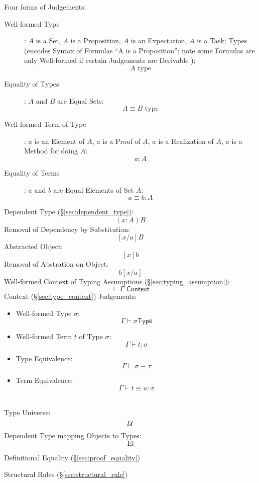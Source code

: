 Four forms of Judgements:
\begin{description}
  \item [Well-formed Type]: $A$ is a Set, $A$ is a Proposition, $A$ is
    an Expectation, $A$ is a Task; Types (encodes Syntax of Formulas
    ``A is a Proposition''; note some Formulas are only Well-formed if
    certain Judgements are Derivable \cite{thompson99}):
    \[
      A \text{ type}
    \]
  \item [Equality of Types]: $A$ and $B$ are Equal Sets:
    \[
      A \equiv B \text{ type}
    \]
  \item [Well-formed Term of Type]: $a$ is an Element of $A$, $a$ is a
    Proof of $A$, $a$ is a Realization of $A$, $a$ is a Method for
    doing $A$:
    \[
      a : A
    \]
  \item [Equality of Terms]: $a$ and $b$ are Equal Elements of Set $A$:
    \[
      a \equiv b : A
    \]
\end{description}

Dependent Type (\S\ref{sec:dependent_type}):
\[
  (x:A)B
\]
Removal of Dependency by Substitution:
\[
  [x/a]B
\]
Abstracted Object:
\[
  [x]b
\]
Removal of Abstration on Object:
\[
  b[x/a]
\]
Well-formed Context of Typing Assumptions
(\S\ref{sec:typing_assumption}):
\[
  \vdash \Gamma \textsf{ Context}
\]
Context (\S\ref{sec:type_context}) Judgements:
\begin {itemize}
\item Well-formed Type $\sigma$:
  \[
    \Gamma \vdash \sigma \mathsf{ Type}
  \]
\item Well-formed Term $t$ of Type $\sigma$:
  \[
    \Gamma \vdash t : \sigma
  \]
\item Type Equivalence:
  \[
    \Gamma \vdash \sigma \equiv \tau
  \]
\item Term Equivalence:
  \[
    \Gamma \vdash t \equiv u : \sigma
  \]
\end {itemize}
\hfill\\
Type Universe:
\[
  \mathcal{U}
\]
Dependent Type mapping Objects to Types:
\[
  \textrm{El}
\]

Definitional Equality (\S\ref{sec:proof_equality})

Structural Rules (\S\ref{sec:structural_rule})



